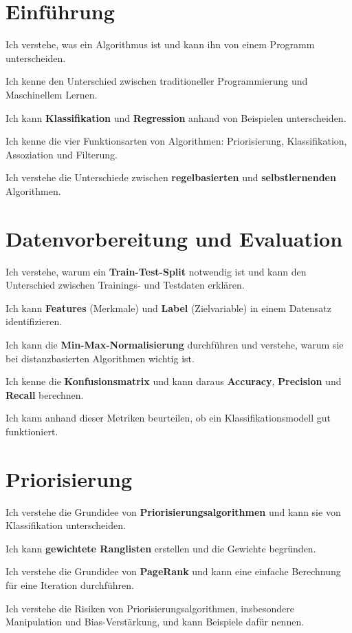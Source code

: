 \section{Einführung}
\begin{todolist}
    \item Ich verstehe, was ein Algorithmus ist und kann ihn von einem Programm unterscheiden.
    \item Ich kenne den Unterschied zwischen traditioneller Programmierung und Maschinellem Lernen.
    \item Ich kann \textbf{Klassifikation} und \textbf{Regression} anhand von Beispielen unterscheiden.
    \item Ich kenne die vier Funktionsarten von Algorithmen: Priorisierung, Klassifikation, Assoziation und Filterung.
    \item Ich verstehe die Unterschiede zwischen \textbf{regelbasierten} und \textbf{selbstlernenden} Algorithmen.
\end{todolist}

\section{Datenvorbereitung und Evaluation}
\begin{todolist}
    \item Ich verstehe, warum ein \textbf{Train-Test-Split} notwendig ist und kann den Unterschied zwischen Trainings- und Testdaten erklären.
    \item Ich kann \textbf{Features} (Merkmale) und \textbf{Label} (Zielvariable) in einem Datensatz identifizieren.
    \item Ich kann die \textbf{Min-Max-Normalisierung} durchführen und verstehe, warum sie bei distanzbasierten Algorithmen wichtig ist.
    \item Ich kenne die \textbf{Konfusionsmatrix} und kann daraus \textbf{Accuracy}, \textbf{Precision} und \textbf{Recall} berechnen.
    \item Ich kann anhand dieser Metriken beurteilen, ob ein Klassifikationsmodell gut funktioniert.
\end{todolist}

\section{Priorisierung}
\begin{todolist}
    \item Ich verstehe die Grundidee von \textbf{Priorisierungsalgorithmen} und kann sie von Klassifikation unterscheiden.
    \item Ich kann \textbf{gewichtete Ranglisten} erstellen und die Gewichte begründen.
    \item Ich verstehe die Grundidee von \textbf{PageRank} und kann eine einfache Berechnung für eine Iteration durchführen.
    \item Ich verstehe die Risiken von Priorisierungsalgorithmen, insbesondere Manipulation und Bias-Verstärkung, und kann Beispiele dafür nennen.
\end{todolist}


